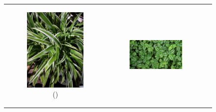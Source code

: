 \documentclass{BachelorBUI}
\begin{document}
        \begin{figure}[!h]
            \centering
            \begin{tabular}{ccc}
                \begin{subfigure}{0.25\textwidth}
                    \centering
                    \includegraphics[width=\textwidth]{1_artificial_background.jpg}
                    \caption{\centering(\cite{1_artificial_background:2021})}
                \end{subfigure} &
                \begin{subfigure}{0.40\textwidth}
                    \centering
                    \includegraphics[width=\textwidth]{2_artificial_background.jpg}

\end{subfigure}
\end{tabular}
\end{figure}
\end{document}

